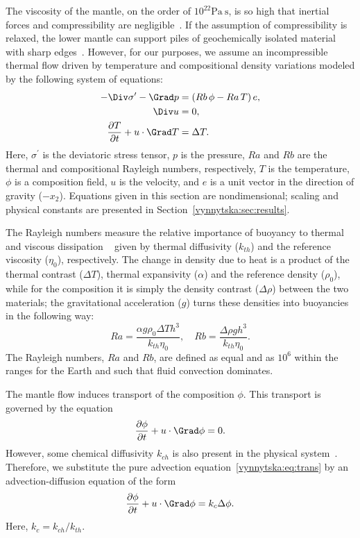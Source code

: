The viscosity of the mantle, on the order of $10^{22} \mathrm{Pa~s}$,
is so high that inertial forces and compressibility are
negligible~\citep{Ricard2009}. If the assumption of compressibility is
relaxed, the lower mantle can support piles of geochemically isolated
material with sharp edges~\citep{TanGurnis2005}. However, for our
purposes, we assume an incompressible thermal flow driven by
temperature and compositional density variations modeled by the
following system of equations:
\begin{align}
  \label{vynnytska:eq:momentum}
  - \Div \sigma^{\prime} - \Grad p
  &=  \left( Rb \, \phi - Ra \, T \right) e,
\\
  \label{vynnytska:eq:incompress}
  \Div u & =  0,
\\
  \label{vynnytska:eq:energy}
  \frac{\partial T}{\partial t} + u \cdot \Grad T & =  \Delta T.
\end{align}
Here, $\sigma^{\prime}$ is the deviatoric stress tensor, $p$
is the pressure, $Ra$ and $Rb$ are the thermal and compositional
Rayleigh numbers, respectively, $T$ is the temperature, $\phi$ is a
composition field, $u$ is the velocity, and $e$ is a unit vector in
the direction of gravity ($-x_2$). Equations given in this section
are nondimensional; scaling and physical constants are presented in
Section~\ref{vynnytska:sec:results}.

The Rayleigh numbers measure the relative importance of buoyancy to
thermal and viscous dissipation ~\citep{KennettBunge2008} given by
thermal diffusivity ($k_{th}$) and the reference viscosity ($\eta_0$),
respectively.  The change in density due to heat is a product of the
thermal contrast ($\Delta T$), thermal expansivity ($\alpha$) and the
reference density ($\rho_0$), while for the composition it is simply
the density contrast ($\Delta \rho$) between the two materials; the
gravitational acceleration ($g$) turns these densities into buoyancies
in the following way:
\begin{equation}
  Ra = \frac{\alpha g \rho_0 \Delta T h^3}{k_{th} \eta_0},  \quad
  Rb = \frac{\Delta \rho g h^3}{k_{th} \eta_0}.
\end{equation}
The Rayleigh numbers, $Ra$ and $Rb$, are defined as equal and as $10^{6}$
within the ranges for the Earth \citep{MontagueKelloggManga1998} and
such that fluid convection dominates.

The mantle flow induces transport of the composition $\phi$. This
transport is governed by the equation
\begin{equation}
  \label{vynnytska:eq:trans}
  \frac{\partial \phi}{\partial t} +  u \cdot \Grad \phi = 0.
\end{equation}
However, some chemical diffusivity $k_{ch}$ is also present in the
physical system~\citep{KekenEtAl1997, HansenYuen1988}. Therefore, we
substitute the pure advection equation~\eqref{vynnytska:eq:trans} by
an advection-diffusion equation of the form
\begin{equation}
  \label{vynnytska:eq:transdif}
  \frac{\partial \phi}{\partial t}
  + u  \cdot \Grad \phi =  k_c \Delta \phi.
\end{equation}
Here, $k_c = k_{ch}/k_{th}$.

